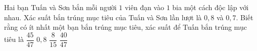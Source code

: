 \begin{ex}%
	Hai bạn Tuấn và Sơn bắn mỗi người $1$ viên đạn vào $1$ bia  một cách độc lập với nhau. Xác suất bắn trúng mục tiêu của Tuấn và Sơn lần lượt là $0{,}8$ và $0{,}7$. Biết rằng có ít nhất một bạn bắn trúng mục tiêu, xác suất để Tuấn bắn trúng mục tiêu là
	 \choice
		{$\dfrac{45}{47}$} 
		{$0{,}8$} 
		 {$\dfrac{8}{15}$}
		{\True $\dfrac{40}{47}$} 
\end{ex}

